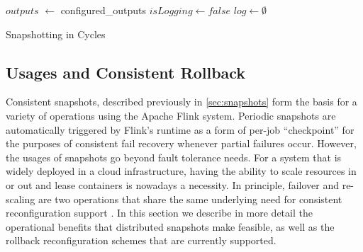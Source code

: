 
\begin{algorithm}[t]
$outputs$ $\leftarrow$ configured\_outputs\;
$isLogging \leftarrow false$ \;
$log \leftarrow \emptyset$ \;

\caption{Snapshotting in Cycles}
\label{alg:snapcycle}
\end{algorithm}


\subsection{Usages and Consistent Rollback}


Consistent snapshots, described previously in \autoref{sec:snapshots} form the basis for a variety of operations using the Apache Flink system. Periodic snapshots are automatically triggered by Flink's runtime as a form of per-job ``checkpoint'' for the purposes of consistent fail recovery whenever partial failures occur. However, the usages of snapshots go beyond fault tolerance needs. For a system that is widely deployed in a cloud infrastructure, having the ability to scale resources in or out and lease containers is nowadays a necessity. In principle, failover and re-scaling are two operations that share the same underlying need for consistent reconfiguration support \cite{castro2013integrating}. In this section we describe in more detail the operational benefits that distributed snapshots make feasible, as well as the rollback reconfiguration schemes that are currently supported.

